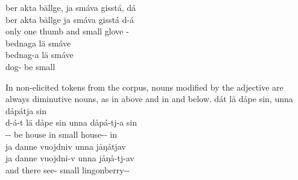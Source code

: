 \z
\ea\label{smallADJex3}
\glll	ber akta bällge, ja smáva gisstá, dá\\
	ber akta bällge ja smáva gisstá d-á\\
	only one thumb\BS{} and small glove\BS{} -\BS{}\\\nopagebreak
{}	
\z
\ea\label{smallADJex4}
\glll	bednaga lä smáve\\
	bednag-a lä smáve\\
	dog- be\BS{} small\BS{}\\\nopagebreak
{}	
\z

In non-elicited tokens from the corpus, nouns modified by the adjective  are always diminutive nouns, as in  above and in  and  below.
\ea\label{smallADJex5}
\glll	dát lä dåpe sin, unna dåpátja sin\\
	d-á-t lä dåpe sin unna dåpá-tj-a sin\\
	-- be\BS{} house\BS{} in small house-- in\\\nopagebreak
{}	
\z
\ea\label{smallADJex6}
\glll	ja danne vuojdniv unna jåŋåtjav\\
	ja danne vuojdni-v unna jåŋå-tj-av\\
	and there see- small lingonberry--\\\nopagebreak
{}	
\z


